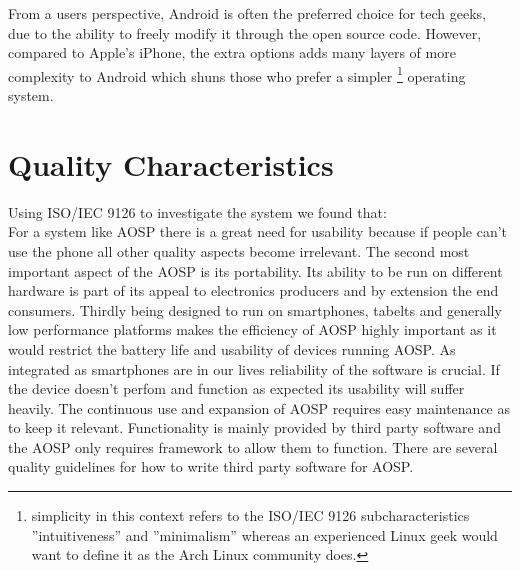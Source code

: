 \documentclass[conference]{IEEEtran}
\begin{document}
From a users perspective, Android is often the preferred choice for tech geeks, due to the ability to freely modify it through the open source code. However, compared to Apple's iPhone, the extra options adds many layers of more complexity to Android which shuns those who prefer a simpler \footnote{simplicity in this context refers to the ISO/IEC 9126\cite{jung2004} subcharacteristics ''intuitiveness'' and ''minimalism'' whereas an experienced Linux geek would want to define it as the Arch Linux community does\cite{archway}.} operating system. 


\section{Quality Characteristics}
\label{quality}

Using ISO/IEC 9126\cite{jung2004} to investigate the system we found that: \\
For a system like AOSP there is a great need for usability because if people can't use the phone all other quality aspects become irrelevant. The second most important aspect of the AOSP is its portability. Its ability to be run on different hardware is part of its appeal to electronics producers and by extension the end consumers. Thirdly being designed to run on smartphones, tabelts and generally low performance platforms makes the efficiency of AOSP highly important as it would restrict the battery life and usability of devices running AOSP. As integrated as smartphones are in our lives reliability of the software is crucial. If the device doesn't perfom and function as expected its usability will suffer heavily. The continuous use and expansion of AOSP requires easy maintenance as to keep it relevant. Functionality is mainly provided by third party software and the AOSP only requires framework to allow them to function. There are several quality guidelines for how to write third party software for AOSP\cite{android-quality}.
\end{document}
